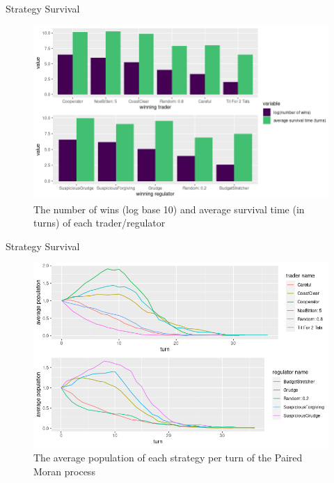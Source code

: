 \documentclass{beamer}
\begin{document}
\begin{frame}{Strategy Survival}
\begin{figure}[!h]
    \includegraphics[width=\textwidth]{barplot.png}
    \caption{The number of wins (log base 10) and average survival time (in turns) of each trader/regulator}
    \label{fig:f2}
\end{figure}

\end{frame}

\begin{frame}{Strategy Survival}
\begin{figure}[!h]
    \includegraphics[width=\textwidth]{survival_lines.png}
    \caption{The average population of each strategy per turn of the Paired Moran process}
    \label{fig:f2}
\end{figure}

\end{frame}
\end{document}
